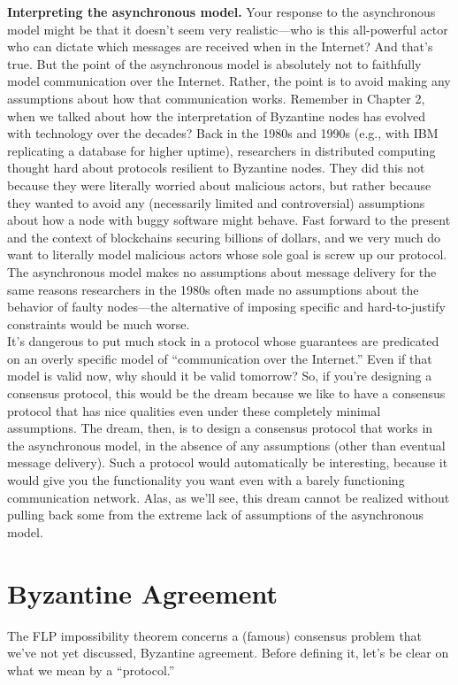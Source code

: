 \noindent
\textbf{Interpreting the asynchronous model.} Your response to the asynchronous model might
be that it doesn't seem very realistic—who is this all-powerful actor who can dictate which
messages are received when in the Internet? And that’s true. But the point of the asynchronous model 
is absolutely not to faithfully model communication over the Internet.
Rather, the point is to avoid making any assumptions about how that communication works.
Remember in Chapter 2, when we talked about how the interpretation of Byzantine nodes
has evolved with technology over the decades? Back in the 1980s and 1990s (e.g., with IBM
replicating a database for higher uptime), researchers in distributed computing thought hard
about protocols resilient to Byzantine nodes. They did this not because they were literally
worried about malicious actors, but rather because they wanted to avoid any (necessarily
limited and controversial) assumptions about how a node with buggy software might behave.
Fast forward to the present and the context of blockchains securing billions of dollars, and
we very much do want to literally model malicious actors whose sole goal is screw up our
protocol.\\
The asynchronous model makes no assumptions about message delivery for the same
reasons researchers in the 1980s often made no assumptions about the behavior of faulty
nodes—the alternative of imposing specific and hard-to-justify constraints would be much
worse.\\
It’s dangerous to put much stock in a protocol whose guarantees are predicated on an
overly specific model of “communication over the Internet.” Even if that model is valid now,
why should it be valid tomorrow? So, if you're designing a consensus protocol, this would be the dream because we like to have a consensus protocol that has nice qualities even under these completely minimal assumptions. The dream, then, is to design a consensus protocol that
works in the asynchronous model, in the absence of any assumptions (other than eventual
message delivery). Such a protocol would automatically be interesting, because it would
give you the functionality you want even with a barely functioning communication network.
Alas, as we’ll see, this dream cannot be realized without pulling back some from the extreme
lack of assumptions of the asynchronous model.


\section{Byzantine Agreement}
The FLP impossibility theorem concerns a (famous) consensus problem that we’ve not yet
discussed, Byzantine agreement. Before defining it, let’s be clear on what we mean by a
“protocol.”\\

